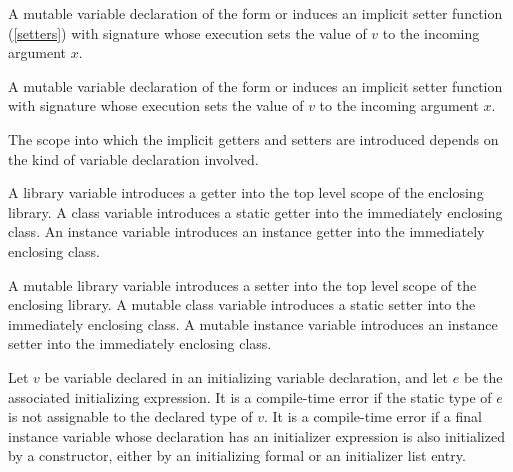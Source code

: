 \documentclass[makeidx]{article}
\begin{document}
\LMHash{}%
A mutable variable declaration of the form
or 
induces an implicit setter function (\ref{setters}) with signature
whose execution sets the value of $v$ to the incoming argument $x$.

\LMHash{}%
A mutable variable declaration of the form
or 
induces an implicit setter function with signature
whose execution sets the value of $v$ to the incoming argument $x$.

\LMHash{}%
The scope into which the implicit getters and setters are introduced depends on the kind of variable declaration involved.

\LMHash{}%
A library variable introduces a getter into the top level scope of the enclosing library.
A class variable introduces a static getter into the immediately enclosing class.
An instance variable introduces an instance getter into the immediately enclosing class.

\LMHash{}%
A mutable library variable introduces a setter into the top level scope of the enclosing library.
A mutable class variable introduces a static setter into the immediately enclosing class.
A mutable instance variable introduces an instance setter into the immediately enclosing class.

\LMHash{}%
Let $v$ be variable declared in an initializing variable declaration,
and let $e$ be the associated initializing expression.
It is a compile-time error if the static type of $e$ is not assignable to the declared type of $v$.
It is a compile-time error if a final instance variable whose declaration has an initializer expression
is also initialized by a constructor, either by an initializing formal or an initializer list entry.

\end{document}
